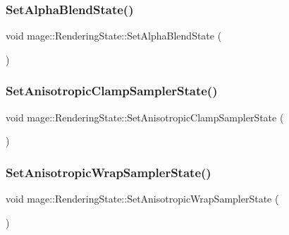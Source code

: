 \hypertarget{structmage_1_1_rendering_state_a7f97752f22b0a32912f24d16c1aa2441}{}\label{structmage_1_1_rendering_state_a7f97752f22b0a32912f24d16c1aa2441} 
\subsubsection{\texorpdfstring{Set\+Alpha\+Blend\+State()}{SetAlphaBlendState()}}
{\footnotesize\ttfamily void mage\+::\+Rendering\+State\+::\+Set\+Alpha\+Blend\+State (\begin{DoxyParamCaption}{ }\end{DoxyParamCaption})}

\hypertarget{structmage_1_1_rendering_state_a52b80c58015fb64f0b8afa7712807ccd}{}\label{structmage_1_1_rendering_state_a52b80c58015fb64f0b8afa7712807ccd} 
\subsubsection{\texorpdfstring{Set\+Anisotropic\+Clamp\+Sampler\+State()}{SetAnisotropicClampSamplerState()}}
{\footnotesize\ttfamily void mage\+::\+Rendering\+State\+::\+Set\+Anisotropic\+Clamp\+Sampler\+State (\begin{DoxyParamCaption}{ }\end{DoxyParamCaption})}

\hypertarget{structmage_1_1_rendering_state_a92318b9b250555ca1d6b516d49371abc}{}\label{structmage_1_1_rendering_state_a92318b9b250555ca1d6b516d49371abc} 
\subsubsection{\texorpdfstring{Set\+Anisotropic\+Wrap\+Sampler\+State()}{SetAnisotropicWrapSamplerState()}}
{\footnotesize\ttfamily void mage\+::\+Rendering\+State\+::\+Set\+Anisotropic\+Wrap\+Sampler\+State (\begin{DoxyParamCaption}{ }\end{DoxyParamCaption})}

